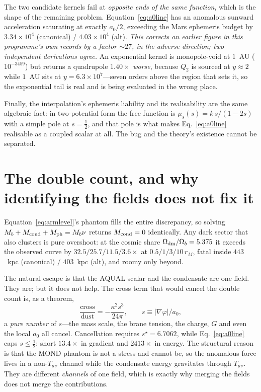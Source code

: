 \documentclass[aps,prd,twocolumn,superscriptaddress,nofootinbib,floatfix]{revtex4-2}
\begin{document}
The two candidate kernels fail at \emph{opposite ends of the same function}, which is the
shape of the remaining problem. Equation~\eqref{eq:a0line} has an anomalous sunward
acceleration saturating at exactly $a_0/2$, exceeding the Mars ephemeris budget by
$3.34\times10^{4}$ (canonical) / $4.03\times10^{4}$ (alt). \emph{This corrects an earlier
figure in this programme's own records by a factor ${\sim}27$, in the adverse direction;
two independent derivations agree.} An exponential kernel is monopole-void at $1$~AU
($10^{-3459}$) but returns a quadrupole $1.40\times$ \emph{worse}, because $Q_2$ is sourced
at $y\approx2$ while $1$~AU sits at $y = 6.3\times10^{7}$---seven orders above the region
that sets it, so the exponential tail is real and is being evaluated in the wrong place.

Finally, the interpolation's ephemeris liability and its realisability are the same
algebraic fact: in two-potential form the free function is $\mu_s(s) = k\,s/(1-2s)$ with a
simple pole at $s=\tfrac12$, and that pole is what makes Eq.~\eqref{eq:a0line} realisable
as a coupled scalar at all. The bug and the theory's existence cannot be separated.

\section{The double count, and why identifying the fields does not fix it}

Equation~\eqref{eq:armlevel}'s phantom fills the entire discrepancy, so solving
$M_b + M_{\rm cond} + M_{\rm ph} = M_b\nu$ returns $M_{\rm cond} = 0$ identically. Any
dark sector that also clusters is pure overshoot: at the cosmic share
$\Omega_{\rm dm}/\Omega_b = 5.375$ it exceeds the observed curve by
$32.5/25.7/11.5/3.6\times$ at $0.5/1/3/10\,r_M$, fatal inside $443$~kpc (canonical) /
$403$~kpc (alt), and roomy only beyond.

The natural escape is that the AQUAL scalar and the condensate are one field. They are;
but it does not help. The cross term that would cancel the double count is, as a theorem,
\begin{equation}
\frac{\text{cross}}{\text{dust}} = -\frac{\kappa^2 s^3}{24\pi},
\qquad s \equiv |\nabla\varphi|/a_0 ,
\end{equation}
a \emph{pure number} of $s$---the mass scale, the brane tension, the charge, $G$ and even
the local $a_0$ all cancel. Cancellation requires $s^\star = 6.7062$, while
Eq.~\eqref{eq:a0line} caps $s \le \tfrac12$: short $13.4\times$ in gradient and
$2413\times$ in energy. The structural reason is that the MOND phantom is not a stress and
cannot be, so the anomalous force lives in a non-$T_{\mu\nu}$ channel while the condensate
energy gravitates through $T_{\mu\nu}$. They are different \emph{channels} of one field,
which is exactly why merging the fields does not merge the contributions.
\end{document}
